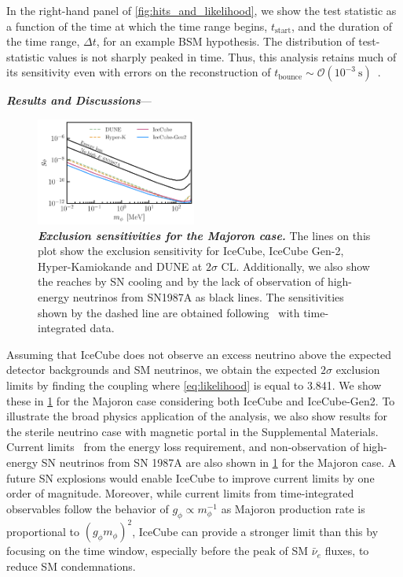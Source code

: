\documentclass[aps,twocolumn,prl,showpacs,showkeys,preprintnumbers,superscriptaddress,nobibnotes,floatfix,longbibliography,notitlepage,nofootinbib]{revtex4-2}
\begin{document}
In the right-hand panel of \cref{fig:hits_and_likelihood}, we show the test statistic as a function of the time at which the time range begins, $t_{\mathrm{start}}$, and the duration of the time range, $\Delta t$, for an example BSM hypothesis. The distribution of test-statistic values is not sharply peaked in time.
Thus, this analysis retains much of its sensitivity even with errors on the reconstruction of $t_{\mathrm{bounce}}\sim\mathcal{O}\left(10^{-3}~\mathrm{s}\right)$~\cite{Halzen_2009}.




\textbf{\textit{Results and Discussions}}---
\begin{figure}[t!]
    \centering
    \includegraphics[width=0.47\textwidth]{figures/majoran_sensitivity}
    \caption{\textbf{\textit{Exclusion sensitivities for the Majoron case.}}
    The lines on this plot show the exclusion sensitivity for IceCube, IceCube Gen-2, Hyper-Kamiokande and DUNE at $2\sigma$ CL.
    Additionally, we also show the reaches by SN cooling and by the lack of observation of high-energy neutrinos from SN1987A as black lines. 
    The sensitivities shown by the dashed line are obtained following~\cite{Brdar:2023tmi} with time-integrated data.
    }
    \label{fig:sensitivity}
\end{figure} 
Assuming that IceCube does not observe an excess neutrino above the expected detector backgrounds and SM neutrinos, we obtain the expected $2\sigma$ exclusion limits by finding the coupling where \cref{eq:likelihood} is equal to 3.841.
We show these in \cref{fig:sensitivity} for the Majoron case considering both IceCube and IceCube-Gen2.
To illustrate the broad physics application of the analysis, we also show results for the sterile neutrino case with magnetic portal in the Supplemental Materials.
Current limits~\cite{Fiorillo:2022cdq} from the energy loss requirement, and non-observation of high-energy SN neutrinos from SN 1987A are also shown in \cref{fig:sensitivity} for the Majoron case.
A future SN explosions would enable IceCube to improve current limits by one order of magnitude. 
Moreover, while current limits from time-integrated observables follow the behavior of $g_\phi\propto m^{-1}_\phi$ as Majoron production rate is proportional to $(g_\phi m_\phi)^2$, IceCube can provide a stronger limit than this by focusing on the time window, especially before the peak of SM $\bar{\nu}_e$ fluxes, to reduce SM condemnations.
\end{document}
